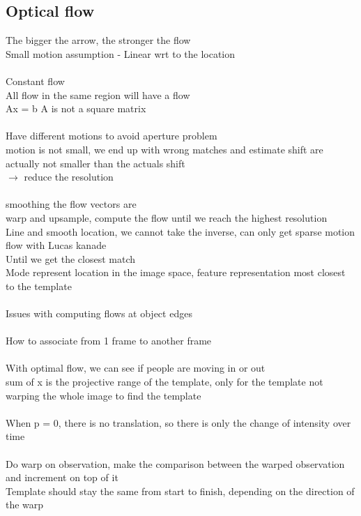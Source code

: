 \documentclass[11pt]{article}
\begin{document}
\subsection*{Optical flow}
The bigger the arrow, the stronger the flow
\\
Small motion assumption - Linear wrt to the location
\\\\
Constant flow\\
All flow in the same region will have a flow
\\
Ax = b A is not a square matrix
\\\\
Have different motions to avoid aperture problem\\
motion is not small, we end up with wrong matches and estimate shift are actually not smaller than the actuals shift
\\
$\rightarrow$ reduce the resolution
\\
\\
smoothing the flow vectors are 
\\
warp and upsample,
compute the flow until we reach the highest resolution
\\
Line and smooth location, we cannot take the inverse, can only get sparse motion flow with Lucas kanade
\\
Until we get the closest match\\
Mode represent location in the image space, feature representation most closest to the template\\\\
Issues with computing flows at object edges\\
\\
How to associate from 1 frame to another frame\\\\
With optimal flow, we can see if people are moving in or out
\\
sum of x is the projective range of the template, only for the template not warping the whole image to find the template\\
\\
When p = 0, there is no translation, so there is only the change of intensity over time\\\\
Do warp on observation, make the comparison between the warped observation and increment on top of it
\\
Template should stay the same from start to finish, depending on the direction of the warp\\\\
\end{document}

